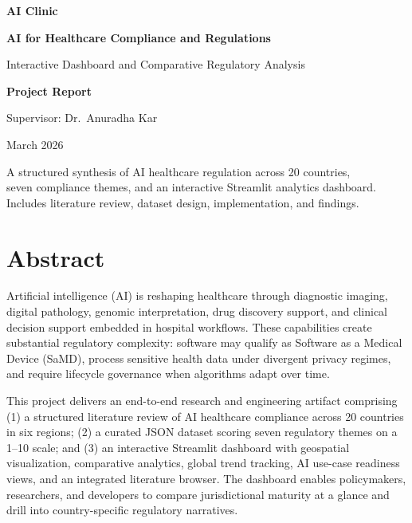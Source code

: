 \documentclass[12pt,a4paper]{report}
\begin{document}
\begin{titlepage}
  \centering
  \vspace*{1.5cm}
  {\LARGE\bfseries AI Clinic\par}
  \vspace{0.6cm}
  {\huge\bfseries AI for Healthcare Compliance and Regulations\par}
  \vspace{0.4cm}
  {\Large Interactive Dashboard and Comparative Regulatory Analysis\par}
  \vspace{2cm}
  {\large\textbf{Project Report}\par}
  \vspace{1.5cm}
  {\large Supervisor: Dr.\ Anuradha Kar\par}
  \vspace{0.5cm}
  {\large March 2026\par}
  \vfill
  {\normalsize
  A structured synthesis of AI healthcare regulation across 20 countries,\\
  seven compliance themes, and an interactive Streamlit analytics dashboard.\\
  Includes literature review, dataset design, implementation, and findings.\par}
\end{titlepage}

\chapter*{Abstract}

Artificial intelligence (AI) is reshaping healthcare through diagnostic imaging, digital pathology, genomic interpretation, drug discovery support, and clinical decision support embedded in hospital workflows. These capabilities create substantial regulatory complexity: software may qualify as Software as a Medical Device (SaMD), process sensitive health data under divergent privacy regimes, and require lifecycle governance when algorithms adapt over time.

This project delivers an end-to-end research and engineering artifact comprising (1) a structured literature review of AI healthcare compliance across 20 countries in six regions; (2) a curated JSON dataset scoring seven regulatory themes on a 1--10 scale; and (3) an interactive Streamlit dashboard with geospatial visualization, comparative analytics, global trend tracking, AI use-case readiness views, and an integrated literature browser. The dashboard enables policymakers, researchers, and developers to compare jurisdictional maturity at a glance and drill into country-specific regulatory narratives.
\end{document}
